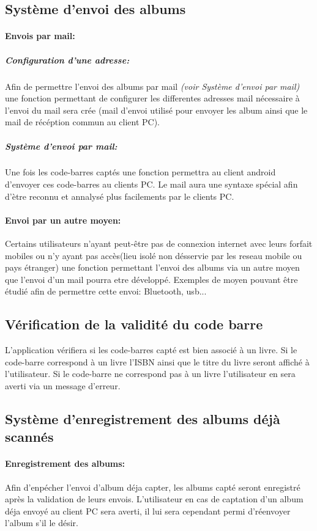 \subsection{Système d'envoi des albums}
\paragraph{Envois par mail:}
\subparagraph{Configuration d'une adresse:}
Afin de permettre l'envoi des albums par mail \textit{(voir Système d'envoi par mail)} une fonction permettant de configurer les differentes adresses mail nécessaire à l'envoi du mail sera crée (mail d'envoi utilisé pour envoyer les album ainsi que le mail de récéption commun au client PC).

\subparagraph{Système d'envoi par mail:}
Une fois les code-barres captés une fonction permettra au client android d'envoyer ces code-barres au clients PC. 
Le mail aura une syntaxe spécial afin d'ètre reconnu et annalysé plus facilements par le clients PC. 

\paragraph{Envoi par un autre moyen:}
Certains utilisateurs n'ayant peut-être pas de connexion internet avec leurs forfait mobiles ou n'y ayant pas accès(lieu isolé non désservie par les reseau mobile ou pays étranger) une fonction permettant l'envoi des albums via un autre moyen que l'envoi d'un mail pourra etre développé.
Exemples de moyen pouvant être étudié afin de permettre cette envoi: Bluetooth, usb...

\subsection{Vérification de la validité du code barre}
L'application vérifiera si les code-barres capté est bien associé à un livre.
Si le code-barre correspond à un livre l'ISBN ainsi que le titre du livre seront affiché à l'utilisateur.
Si le code-barre ne correspond pas à un livre l'utilisateur en sera averti via un message d'erreur.

\subsection{Système d'enregistrement des albums déjà scannés}
\paragraph{Enregistrement des albums:} 
Afin d'enpécher l'envoi d'album déja capter, les albums capté seront enregistré après la validation de leurs envois. 
L'utilisateur en cas de captation d'un album déja envoyé au client PC sera averti, il lui sera cependant permi d'réenvoyer l'album s'il le désir.

